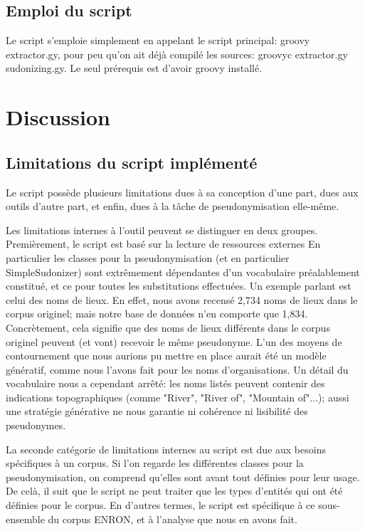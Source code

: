 \documentclass{article}
\begin{document}
\subsection{Emploi du script}
\par
Le script s'emploie simplement en appelant le script principal: groovy extractor.gy, pour peu qu'on ait déjà compilé les sources: groovyc extractor.gy sudonizing.gy.
Le seul prérequis est d'avoir groovy installé.

\section{Discussion}
\subsection{Limitations du script implémenté}
\par
Le script possède plusieurs limitations dues à sa conception d'une part, dues aux outils d'autre part, et enfin, dues à la tâche de pseudonymisation elle-même.
\par
Les limitations internes à l'outil peuvent se distinguer en deux groupes.
Premièrement, le script est basé sur la lecture de ressources externes
En particulier les classes pour la pseudonymisation (et en particulier SimpleSudonizer) sont extrêmement dépendantes d'un vocabulaire préalablement constitué, et ce pour toutes les substitutions effectuées.
Un exemple parlant est celui des noms de lieux.
En effet, nous avons recensé 2,734 noms de lieux dans le corpus originel; mais notre base de données n'en comporte que 1,834.
Concrètement, cela signifie que des noms de lieux différents dans le corpus originel peuvent (et vont) recevoir le même pseudonyme.
L'un des moyens de contournement que nous aurions pu mettre en place aurait été un modèle génératif, comme nous l'avons fait pour les noms d'organisations.
Un détail du vocabulaire nous a cependant arrêté: les noms listés peuvent contenir des indications topographiques (comme "River", "River of", "Mountain of"...); aussi une stratégie générative ne nous garantie ni cohérence ni lisibilité des pseudonymes.
\par
La seconde catégorie de limitations internes au script est due aux besoins spécifiques à un corpus.
Si l'on regarde les différentes classes pour la pseudonymisation, on comprend qu'elles sont avant tout définies pour leur usage.
De celà, il suit que le script ne peut traiter que les types d'entités qui ont été définies pour le corpus.
En d'autres termes, le script est spécifique à ce sous-ensemble du corpus ENRON, et à l'analyse que nous en avons fait.
\end{document}
